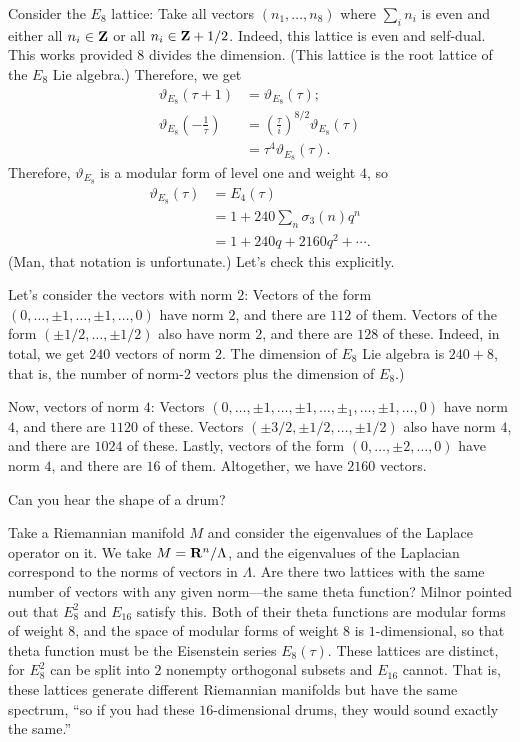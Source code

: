 \documentclass[11pt, oneside,margin=1in]{article}
\begin{document}
Consider the $E_8$ lattice: Take all vectors $(n_1,\hdots, n_8)$ where $\sum_{i}^{} n_i$ is even and either all $n_i\in \mathbf Z$ or all $n_i\in \mathbf Z+1/2$. Indeed, this lattice is even and self-dual. This works provided $8$ divides the dimension. (This lattice is the root lattice of the $E_8$ Lie algebra.) Therefore, we get
\begin{align*}
	\vartheta_{E_8 }(\tau + 1) &= \vartheta_{E_8 }(\tau) ;\\
	\vartheta_{E_8 } \left( -\frac{1}{\tau} \right) &= \left( \frac{\tau}{i} \right) ^{8/2} \vartheta_{E_8 }(\tau)\\
							&= \tau^{4} \vartheta_{E_8 } (\tau).
\end{align*}
Therefore, $\vartheta_{E_8 }$ is a modular form of level one and weight $4$, so
\begin{align*}
	\vartheta_{E_8 } (\tau) &=  E_4(\tau) \\
				&= 1 +240 \sum_{n}^{} \sigma_3(n)q^n\\
				&= 1 + 240q + 2160q^2 + \cdots.
\end{align*}
(Man, that notation is unfortunate.)  Let's check this explicitly.

Let's consider the vectors with norm $2$: Vectors of the form $(0,\hdots, \pm 1,\hdots,\pm 1,\hdots,0)$ have norm $2$, and there are $112$ of them. Vectors of the form $(\pm 1/2,\hdots,\pm 1/2)$ also have norm $2$, and there are $128$ of these. Indeed, in total, we get $240$ vectors of norm $2$. The dimension of $E_8$ Lie algebra is $240 + 8$, that is, the number of norm-$2$ vectors plus the dimension of $E_8$.) 

Now, vectors of norm $4$: Vectors $(0,\hdots,\pm 1,\hdots,\pm 1,\hdots, \pm_1,\hdots,\pm 1,\hdots, 0)$ have norm $4$, and there are $1120$ of these. Vectors $(\pm 3/2,\pm 1/2,\hdots, \pm 1/2)$ also have norm $4$, and there are $1024$ of these. Lastly, vectors of the form  $(0,\hdots, \pm 2,\hdots, 0)$ have norm $4$, and there are $16$ of them. Altogether, we have $2160$ vectors.

\begin{problem}
	Can you hear the shape of a drum?
\end{problem}

Take a Riemannian manifold $M$ and consider the eigenvalues of the Laplace operator on it. We take $M=\mathbf R^n/\Lambda$, and the eigenvalues of the Laplacian correspond to the norms of vectors in $\Lambda$. Are there two lattices with the same number of vectors with any given norm---the same theta function? Milnor pointed out that $E_8^2$ and $E_{16}$ satisfy this. Both of their theta functions are modular forms of weight $8$, and the space of modular forms of weight $8$ is $1$-dimensional, so that theta function must be the Eisenstein series $E_8(\tau)$. These lattices are distinct, for $E_8^2$ can be split into $2$ nonempty orthogonal subsets and $E_{16}$ cannot. That is, these lattices generate different Riemannian manifolds but have the same spectrum, ``so if you had these $16$-dimensional drums, they would sound exactly the same.''
\end{document}

